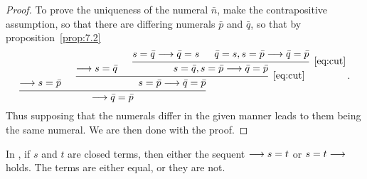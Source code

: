 \documentclass[11pt,a4paper]{article}
\begin{document}
\begin{proof}
    To prove the uniqueness of the numeral \(\bar n\),
    make the contrapositive assumption, so that
    there are differing numerals \(\bar p\) and \(\bar q\),
    so that by proposition~\ref{prop:7.2}
    \begin{equation*}
        \begin{prooftree}
            \hypo{\seq s = \bar p}
            \hypo{\seq s = \bar q}
            \hypo{s = \bar q\seq \bar q = s}
            \hypo{\bar q = s, s = \bar p\seq \bar q = \bar p}
            \infer2[\eqref{eq:cut}]{s = \bar q, s = \bar p\seq \bar q = \bar p}
            \infer2[\eqref{eq:cut}]{s = \bar p\seq \bar q = \bar p}
            \infer2{\seq \bar q = \bar p}
        \end{prooftree} \,.
    \end{equation*}
    Thus supposing that the numerals differ in the given manner
    leads to them being the same numeral. We are then done with
    the proof.
\end{proof}

\begin{proposition}[9.6.2]\label{prop:9.6.2}
    In \PA{}, if \(s\) and \(t\) are closed terms, then either
    the sequent \(\longrightarrow s=t\) or \(s=t\longrightarrow\) holds. The terms
    are either equal, or they are not.
\end{proposition}
\end{document}
